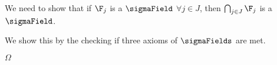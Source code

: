 We need to show that if $\F_j$ is a $\sigmaField$ $\forall j \in J$,
then $\bigcap_{j\in J} \F_j$ is a $\sigmaField$.

We show this by the checking if three axioms of $\sigmaFields$ are met. 

$\Omega$


